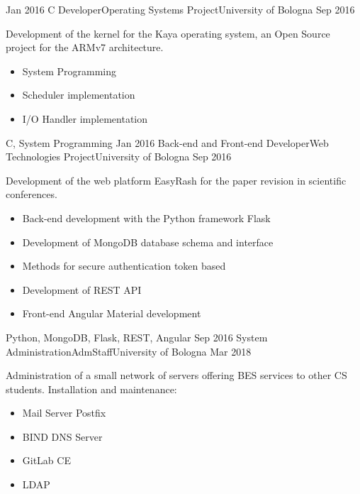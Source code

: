 \begin{experiences}
  \experience
    {Jan 2016}   {C Developer}{Operating Systems Project}{University of Bologna}
    {Sep 2016} {
                      Development of the kernel for the Kaya operating system, an Open Source project for the ARMv7 architecture.
                      \begin{itemize}
                        \item System Programming
                        \item Scheduler implementation
                        \item I/O Handler implementation
                      \end{itemize}
                    }
                    {C, System Programming}
  \emptySeparator
  \experience
    {Jan 2016}   {Back-end and Front-end Developer}{Web Technologies Project}{University of Bologna}
    {Sep 2016} {
                      Development of the web platform EasyRash for the paper revision in scientific conferences.
                      \begin{itemize}
                        \item Back-end development with the Python framework Flask
                        \item Development of MongoDB database schema and interface
                        \item Methods for secure authentication token based
                        \item Development of REST API
                        \item Front-end Angular Material development
                      \end{itemize}
                    }
                    {Python, MongoDB, Flask, REST, Angular}
  \emptySeparator
  \experience
    {Sep 2016}   {System Administration}{AdmStaff}{University of Bologna}
    {Mar 2018} {
                      Administration of a small network of servers offering BES services to other CS students.
                      Installation and maintenance:
                      \begin{itemize}
                        \item Mail Server Postfix
                        \item BIND DNS Server
                        \item GitLab CE
                        \item LDAP

\end{itemize}}
\end{experiences}
